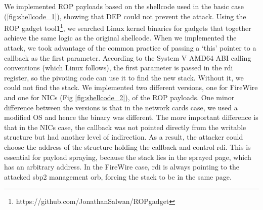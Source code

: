 We implemented ROP payloads based on the shellcode used in the basic case (\ref{fig:shellcode_1}), showing that DEP could not prevent the attack. Using the ROP gadget tool1\footnote{https://github.com/JonathanSalwan/ROPgadget}, we searched Linux kernel binaries for gadgets that together achieve the same logic as the original shellcode. When we implemented the attack, we took advantage
of the common practice of passing a ‘this’ pointer to a callback as the first parameter. According to the System V AMD64 ABI calling conventions (which Linux follows), the first parameter is passed in the rdi register, so the pivoting code can use it to find the new stack. Without it, we could not find the stack.
We implemented two different versions, one for FireWire and one for NICs (Fig \ref{fig:shellcode_2}), of the ROP payloads. One minor difference between the versions is that in the network cards case, we used a modified OS and hence the binary was different. The more important difference is that in the NICs case, the callback was not pointed directly from the writable structure but had another level of indirection. As a result, the attacker could choose the address of the structure holding the callback and control rdi. This is essential for payload spraying, because the stack lies in the sprayed page, which has an arbitrary address. In the FireWire case, rdi is always pointing to the attacked sbp2 management orb, forcing the stack to be in the same page.
